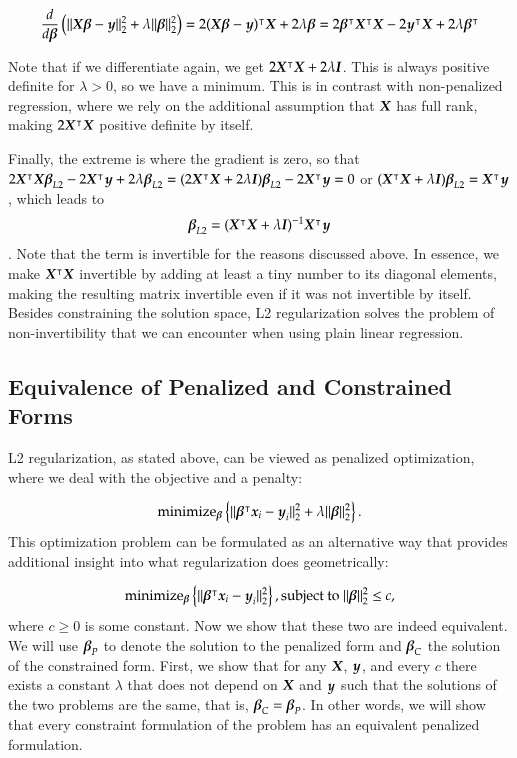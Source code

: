 \begin{refsection}
$$\frac{d}{d\boldsymbol{\beta}} \left(\lVert \boldsymbol{X}\boldsymbol{\beta} - \boldsymbol{y} \rVert^2_2 + \lambda\lVert \boldsymbol{\beta} \rVert^2_2\right) = 2(\boldsymbol{X}\boldsymbol{\beta} - \boldsymbol{y})^\intercal \boldsymbol{X} + 2\lambda\boldsymbol{\beta} = 2\boldsymbol{\beta}^\intercal\boldsymbol{X}^\intercal\boldsymbol{X} - 2\boldsymbol{y}^\intercal\boldsymbol{X} + 2\lambda\boldsymbol{\beta}^\intercal$$

Note that if we differentiate again, we get $2\boldsymbol{X}^\intercal\boldsymbol{X} + 2\lambda \boldsymbol{I}$. This is always positive definite for $\lambda > 0$, so we have a minimum. This is in contrast with non-penalized regression, where we rely on the additional assumption that $\boldsymbol{X}$ has full rank, making $2\boldsymbol{X}^\intercal\boldsymbol{X}$ positive definite by itself.

Finally, the extreme is where the gradient is zero, so that $2\boldsymbol{X}^\intercal\boldsymbol{X}\boldsymbol{\beta}_{L2} - 2\boldsymbol{X}^\intercal\boldsymbol{y} + 2\lambda\boldsymbol{\beta}_{L2} = (2\boldsymbol{X}^\intercal\boldsymbol{X} + 2\lambda \boldsymbol{I})\boldsymbol{\beta}_{L2} - 2\boldsymbol{X}^\intercal\boldsymbol{y} = 0$ or $ (\boldsymbol{X}^\intercal\boldsymbol{X} + \lambda \boldsymbol{I})\boldsymbol{\beta}_{L2} = \boldsymbol{X}^\intercal\boldsymbol{y} $, which leads to
$$\boldsymbol{\beta}_{L2} = (\boldsymbol{X}^\intercal\boldsymbol{X} + \lambda \boldsymbol{I})^{-1}\boldsymbol{X}^\intercal\boldsymbol{y}$$.
%
Note that the term is invertible for the reasons discussed above. In essence, we make $\boldsymbol{X}^\intercal\boldsymbol{X}$ invertible by adding at least a tiny number to its diagonal elements, making the resulting matrix invertible even if it was not invertible by itself. Besides constraining the solution space, L2 regularization solves the problem of non-invertibility that we can encounter when using plain linear regression.

\subsection*{Equivalence of Penalized and Constrained Forms}


L2 regularization, as stated above, can be viewed as penalized optimization, where we deal with the objective and a penalty:

$$\text{minimize}_{\boldsymbol{\beta}} \left\{ \lVert \boldsymbol{\beta}^\intercal\boldsymbol{x}_i - \boldsymbol{y}_i \rVert^2_2 + \lambda\lVert \boldsymbol{\beta} \rVert^2_2\right\}.$$
%
This optimization problem can be formulated as an alternative way that provides additional insight into what regularization does geometrically:

$$\text{minimize}_{\boldsymbol{\beta}} \left\{ \lVert \boldsymbol{\beta}^\intercal\boldsymbol{x}_i - \boldsymbol{y}_i \rVert^2_2\right\}, \text{subject to }  \lVert \boldsymbol{\beta} \rVert^2_2 \leq c, $$
%
where $c \geq 0$ is some constant. Now we show that these two are indeed equivalent. We will use $\boldsymbol{\beta}_P$ to denote the solution to the penalized form and $\boldsymbol{\beta}_C$ the solution of the constrained form. First, we show that for any $\boldsymbol{X}$, $\boldsymbol{y}$, and every $c$ there exists a constant $\lambda$ that does not depend on $\boldsymbol{X}$ and $\boldsymbol{y}$ such that the solutions of the two problems are the same, that is, $\boldsymbol{\beta}_C = \boldsymbol{\beta}_P$. In other words, we will show that every constraint formulation of the problem has an equivalent penalized formulation.


\end{refsection}
